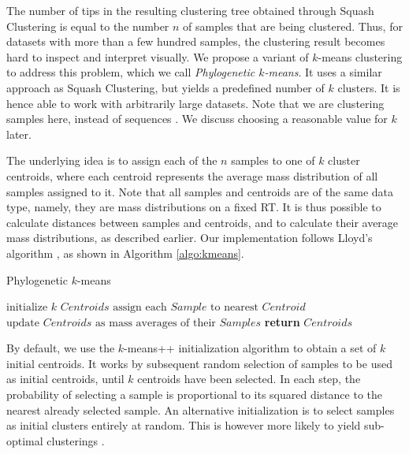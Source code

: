 The number of tips in the resulting clustering tree obtained through Squash Clustering
is equal to the number $n$ of samples that are being clustered.
Thus, for datasets with more than a few hundred samples,
the clustering result becomes hard to inspect and interpret visually.
We propose a variant of $k$-means clustering \cite{Macqueen1967} to address this problem,
which we call \emph{Phylogenetic $k$-means}.
It uses a similar approach as Squash Clustering, but yields a predefined number of $k$ clusters.
It is hence able to work with arbitrarily large datasets.
Note that we are clustering samples here, instead of sequences \cite{Kelley2010}.
We discuss choosing a reasonable value for $k$ later.

The underlying idea is to assign each of the $n$ samples to one of $k$ cluster centroids,
where each centroid represents the average mass distribution of all samples assigned to it.
Note that all samples and centroids are of the same data type,
namely, they are mass distributions on a fixed \ac{RT}.
It is thus possible to calculate distances between samples and centroids,
and to calculate their average mass distributions, as described earlier.
Our implementation follows Lloyd's algorithm \cite{Lloyd1982},
as shown in Algorithm \ref{algo:kmeans}.

\vspace*{1em} %
\begin{algorithm}
\caption{Phylogenetic $k$-means}\label{algo:kmeans}
\begin{algorithmic}[1]
    \State $ \text{initialize } \textit{k Centroids} $
        \State $ \text{assign each } \textit{Sample} \text{ to nearest } \textit{Centroid} $
        \State $ \text{update } \textit{Centroids} \text{ as mass averages of their } \textit{Samples} $
    \EndWhile
    \State \textbf{return}  $\textit{Centroids}$
\end{algorithmic}
\end{algorithm}

By default, we use the $k$-means++ initialization algorithm \cite{Arthur2007} to obtain a set of $k$ initial centroids.
It works by subsequent random selection of samples to be used as initial centroids,
until $k$ centroids have been selected.
In each step, the probability of selecting a sample is
proportional to its squared distance to the nearest already selected sample.
An alternative initialization is to select samples as initial clusters entirely at random.
This is however more likely to yield sub-optimal clusterings \cite{Kanungo2003}.

